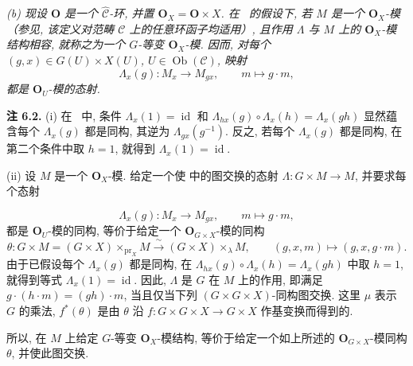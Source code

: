 \textit{(b) 现设 \(\mathbf O\) 是一个
\(\widehat{\mathscr C}\)-环, 并置
\(\mathbf O_X=\mathbf O\times X\). 在~ 的假设下,
若 \(M\) 是一个 \(\mathbf O_X\)-模（参见,
该定义对范畴 \(\mathscr C\) 上的任意环函子均适用）, 且作用 \(\Lambda\)
与 \(M\) 上的 \(\mathbf O_X\)-模结构相容, 就称之为一个
\(G\)-等变 \(\mathbf O_X\)-模. 因而, 对每个
\((g,x)\in G(U)\times X(U)\),
\(U\in\operatorname{Ob}(\mathscr C)\), 映射}
\[
  \Lambda_x(g):M_x\longrightarrow M_{gx},
  \qquad m\longmapsto g\cdot m,
\]
\textit{都是 \(\mathbf O_U\)-模的态射.}

\medskip
\noindent{}\textbf{注 6.2.}
(i) 在~ 中, 条件
\(\Lambda_x(1)=\operatorname{id}\) 和
\(\Lambda_{hx}(g)\circ\Lambda_x(h)=\Lambda_x(gh)\) 显然蕴含每个
\(\Lambda_x(g)\) 都是同构, 其逆为
\(\Lambda_{gx}(g^{-1})\). 反之, 若每个 \(\Lambda_x(g)\) 都是同构,
在第二个条件中取 \(h=1\), 就得到
\(\Lambda_x(1)=\operatorname{id}\).

(ii) 设 \(M\) 是一个 \(\mathbf O_X\)-模. 给定一个使
中的图交换的态射 \(\Lambda:G\times M\to M\), 并要求每个态射

\[
  \Lambda_x(g):M_x\longrightarrow M_{gx},
  \qquad m\longmapsto g\cdot m,
\]
都是 \(\mathbf O_U\)-模的同构, 等价于给定一个
\(\mathbf O_{G\times X}\)-模的同构
\[
  \theta:
  G\times M=(G\times X)\times_{\mathrm{pr}_X}M
  \xrightarrow{\ \sim\ }(G\times X)\times_\lambda M,
  \qquad
  (g,x,m)\longmapsto(g,x,g\cdot m).
\]
由于已假设每个 \(\Lambda_x(g)\) 都是同构, 在
\(\Lambda_{hx}(g)\circ\Lambda_x(h)=\Lambda_x(gh)\) 中取 \(h=1\),
就得到等式 \(\Lambda_x(1)=\operatorname{id}\).
因此, \(\Lambda\) 是 \(G\) 在 \(M\) 上的作用, 即满足
\(g\cdot(h\cdot m)=(gh)\cdot m\), 当且仅当下列
\((G\times G\times X)\)-同构图交换. 这里 \(\mu\) 表示 \(G\) 的乘法,
\(f^*(\theta)\) 是由 \(\theta\) 沿
\(f:G\times G\times X\to G\times X\) 作基变换而得到的.

\begin{figure}[H]
  \centering
  
  \label{fig:sga3-exp1-p040-equivariance-cocycle}
\end{figure}

所以, 在 \(M\) 上给定 \(G\)-等变 \(\mathbf O_X\)-模结构,
等价于给定一个如上所述的 \(\mathbf O_{G\times X}\)-模同构
\(\theta\), 并使此图交换.

